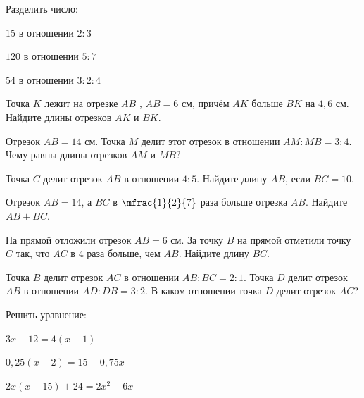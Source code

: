 %
%
%
%
\begin{class}[number=1]
	\begin{listofex}
		\item Разделить число:
		\begin{enumcols}[itemcolumns=3]
			\item \( 15 \) в отношении \( 2:3 \)
			\item \( 120 \) в отношении \( 5:7 \)
			\item \( 54 \) в отношении \( 3:2:4 \)
		\end{enumcols}
		\item Точка \( K \) лежит на отрезке \( AB \) , \( AB=6 \) см, причём \( AK \) больше
		\( BK \) на \( 4,6 \) см. Найдите длины отрезков \( AK \) и \( BK \).
		\item Отрезок \( AB=14 \) см. Точка \( M \) делит этот отрезок в отношении \( AM:MB=3:4 \). Чему равны длины отрезков \( AM \) и \( MB \)?
		\item Точка \( C \) делит отрезок \( AB \) в отношении \( 4:5 \). Найдите длину \( AB \), если \( BC=10 \).
		\item Отрезок \( AB=14 \), а \( BC \) в \( \mfrac{1}{2}{7} \) раза больше отрезка \( AB \). Найдите \( AB+BC \).
		\item На прямой отложили отрезок \( AB=6 \) см. За точку \( B \) на прямой отметили точку \( C \) так, что \( AC \) в \( 4 \) раза больше, чем \( AB \). Найдите длину \( BC \).
		\item Точка \( B \) делит отрезок \( AC \) в отношении \( AB:BC=2:1 \). Точка \( D \) делит отрезок \( AB \) в отношении \( AD:DB=3:2 \). В каком отношении точка \( D \) делит отрезок \( AC \)?
		\item Решить уравнение:
		\begin{enumcols}[itemcolumns=3]
			\item \( 3x-12=4(x-1) \)
			\item \( 0,25(x-2)=15-0,75x \)
			\item \( 2x(x-15)+24=2x^2-6x \)
		\end{enumcols}
	\end{listofex}
\end{class}
%
%
